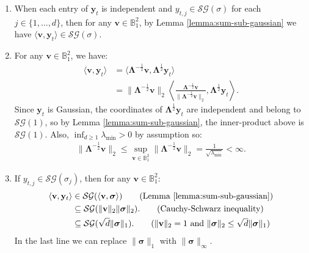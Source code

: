 \begin{enumerate}[label=\roman*)]
    \item When each entry of $\mathbf{y}_t$ is independent and $y_{t,j} \in \mathcal{SG}(\sigma)$ for each $j \in \{1, \ldots, d\}$, then for any $\mathbf{v} \in \mathbb{B}^2_1$, by Lemma \ref{lemma:sum-sub-gaussian} we have $\langle \mathbf{v}, \mathbf{y}_t \rangle \in \mathcal{SG}(\sigma)$.
    \item For any $\mathbf{v} \in \mathbb{B}^2_1$, we have:
    \begin{align*}
        \langle \mathbf{v}, \mathbf{y}_t \rangle &= \langle \boldsymbol{\Lambda}^{-\frac{1}{2}}\mathbf{v}, \boldsymbol{\Lambda}^{\frac{1}{2}}\mathbf{y}_t \rangle \\
        &= \lVert\boldsymbol{\Lambda}^{-\frac{1}{2}}\mathbf{v}\rVert_{2} \left\langle \frac{\boldsymbol{\Lambda}^{-\frac{1}{2}}\mathbf{v}}{\lVert\boldsymbol{\Lambda}^{-\frac{1}{2}}\mathbf{v}\rVert_{2}}, \boldsymbol{\Lambda}^{\frac{1}{2}}\mathbf{y}_t \right\rangle.
    \end{align*}
    Since $\mathbf{y}_t$ is Gaussian, the coordinates of $\boldsymbol{\Lambda}^{\frac{1}{2}}\mathbf{y}_t$ are independent and belong to $\mathcal{SG}(1)$, so by Lemma \ref{lemma:sum-sub-gaussian}, the inner-product above is $\mathcal{SG}(1)$. Also, $\inf_{d\geq 1}  \lambda_{\min} > 0$ by assumption so:
    \begin{align*}
        \lVert\boldsymbol{\Lambda}^{-\frac{1}{2}}\mathbf{v}\rVert_{2} \leq \sup_{\mathbf{v} \in \mathbb{B}^2_1} \lVert\boldsymbol{\Lambda}^{-\frac{1}{2}}\mathbf{v}\rVert_{2} = \frac{1}{\sqrt{\lambda_{\min}}} < \infty.
    \end{align*}
    \item If $y_{t,j} \in \mathcal{SG}(\sigma_j)$, then for any $\mathbf{v} \in \mathbb{B}^2_1$: 
    \begin{align*}
        \langle \mathbf{v}, \mathbf{y}_t \rangle &\in \mathcal{SG}(\langle \mathbf{v}, \boldsymbol{\sigma} \rangle) \tag{Lemma \ref{lemma:sum-sub-gaussian}}\\
        &\subseteq \mathcal{SG}(\lVert\mathbf{v}\rVert_2 \lVert\boldsymbol{\sigma}\rVert_2). \tag{Cauchy-Schwarz inequality} \\
        &\subseteq \mathcal{SG}(\sqrt{d} \lVert \boldsymbol{\sigma}\rVert_1). \tag{$\lVert \mathbf{v}\rVert_2 = 1$ and $\lVert \boldsymbol{\sigma}\rVert_2 \leq \sqrt{d} \lVert \boldsymbol{\sigma}\rVert_1 $}
    \end{align*}    
    In the last line we can replace $\lVert \boldsymbol{\sigma}\rVert_1$ with $\lVert \boldsymbol{\sigma}\rVert_\infty$.
\end{enumerate}

